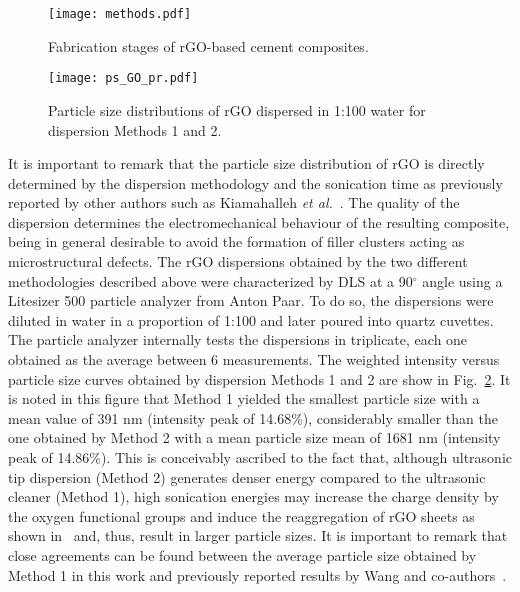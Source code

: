 \documentclass[a4paper,fleqn]{cas-sc}
\begin{document}
\begin{figure}[ht]
    \centering
    \texttt{[image: methods.pdf]}
    \caption{Fabrication stages of rGO-based cement composites.}
    \label{fabrication_samples}
\end{figure}

\begin{figure}[ht]
\centering
\texttt{[image: ps\_GO\_pr.pdf]}
\caption{Particle size distributions of rGO dispersed in 1:100 water for dispersion Methods 1 and 2.}
\label{ps}
\end{figure}

It is important to remark that the particle size distribution of rGO is directly determined by the dispersion methodology and the sonication time as previously reported by other authors such as Kiamahalleh \textit{et al.}~\cite{VALIZADEHKIAMAHALLEH2020118832}. The quality of the dispersion determines the electromechanical behaviour of the resulting composite, being in general desirable to avoid the formation of filler clusters acting as microstructural defects. The rGO dispersions obtained by the two different methodologies described above were characterized by DLS at a 90$^\circ$ angle using a Litesizer 500 particle analyzer from Anton Paar. To do so, the dispersions were diluted in water in a proportion of 1:100 and later poured into quartz cuvettes. The particle analyzer internally tests the dispersions in triplicate, each one obtained as the average between 6 measurements. The weighted intensity versus particle size curves obtained by dispersion Methods 1 and 2 are show in Fig.~\ref{ps}. It is noted in this figure that Method 1 yielded the smallest particle size with a mean value of 391 nm (intensity peak of 14.68\%), considerably smaller than the one obtained by Method 2 with a mean particle size mean of 1681 nm (intensity peak of 14.86\%). This is conceivably ascribed to the fact that, although ultrasonic tip dispersion (Method 2) generates denser energy compared to the ultrasonic cleaner (Method 1), high sonication energies may increase the charge density by the oxygen functional groups and induce the reaggregation of rGO sheets as shown in~\cite{VALIZADEHKIAMAHALLEH2020118832} and, thus, result in larger particle sizes. It is important to remark that close agreements can be found between the average particle size obtained by Method 1 in this work and previously reported results by Wang and co-authors~\cite{wang2017effect}. 

\end{document}
